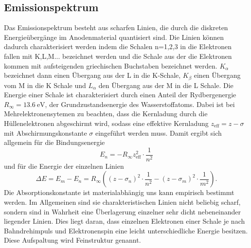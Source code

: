 \subsection{Emissionspektrum}
Das Emissionspektrum besteht aus scharfen Linien, die durch die diskreten
Energieübergänge im Anodenmaterial quantisiert sind. Die Linien können dadurch charakterisiert werden
indem die Schalen n=1,2,3 in die Elektronen fallen mit K,L,M... bezeichnet werden und die Schale aus der die Elektronen kommen
mit aufsteigenden griechischen Buchstaben bezeichnet werden. $K_\alpha$ bezeichnet dann einen Übergang aus der L in die K-Schale, $K_\beta$ einen Übergang
vom M in die K Schale und $L_\alpha$ den Übergang aus der M in die L Schale. Die Energie einer Schale ist charakterisiert durch einen Anteil der Rydbergenergie $R_\infty=\qty{13.6}{\eV}$, der 
Grundzustandsenergie des Wasserstoffatoms. Dabei ist bei Mehrelektronensytemen zu beachten, dass die Kernladung durch die Hüllenelektronen
abgeschirmt wird, sodass eine effektive Kernladung $z_\text{eff}=z-\sigma$ mit Abschirmungskonstante $\sigma$ eingeführt werden muss.
Damit ergibt sich allgemein für die Bindungsenergie
\begin{equation}
    E_n = -R_\infty z_\text{eff}^2\cdot \frac{1}{n^2}
    \label{eq:En-Emission}
\end{equation}
und für die Energie der einzelnen Linien
\begin{equation}
    \Delta E =E_m-E_n= R_\infty ((z-\sigma_n)^2\cdot \frac{1}{n^2}-(z-\sigma_m)^2\cdot \frac{1}{m^2}).
    \label{eq:dE-Emission}
\end{equation}
Die Absorptionskonstante ist materialabhängig uns kann empirisch bestimmt werden.
Im Allgemeinen sind sie charakteristischen Linien nicht beliebig scharf, sondern sind in Wahrheit eine Überlagerung einzelner sehr dicht nebeneinander liegender Linien.
Dies liegt daran, dass einzelnen Elektronen einer Schale je nach
Bahndrehimpuls und Elektronenspin eine leicht unterschiedliche Energie besitzen. Diese Aufspaltung wird Feinstruktur genannt.
